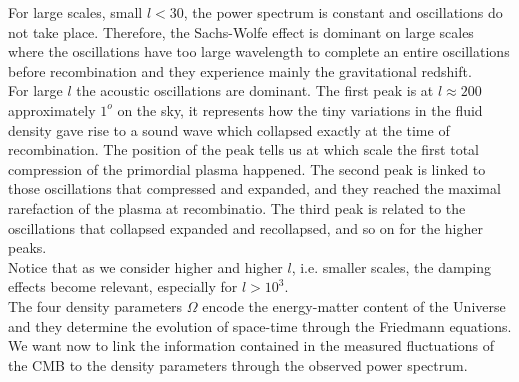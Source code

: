 \documentclass{article}
\begin{document}
%
%
%
For large scales, small $l<30$, the power spectrum is constant and oscillations do not take place.
Therefore, the Sachs-Wolfe effect is dominant on large scales where the oscillations have too large wavelength to complete an entire oscillations before recombination and they experience mainly the gravitational redshift.\\
For large $l$ the acoustic oscillations are dominant.
The first peak is at $l \approx 200$ approximately $1 ^o$ on the sky, it represents how the tiny variations in the fluid density gave rise to a sound wave which collapsed exactly at the time of recombination.
The position of the peak tells us at which scale the first total compression of the primordial plasma happened.
The second peak is linked to those oscillations that compressed and expanded, and they reached the maximal rarefaction of the plasma at recombinatio.
The third peak is related to the oscillations that collapsed expanded and recollapsed, and so on for the higher peaks.\\
Notice that as we consider higher and higher $l$, i.e. smaller scales, the damping effects become relevant, especially for  $l>10^{3}$.\\

The four density parameters $\Omega$ encode the energy-matter content of the Universe and they determine the evolution of space-time through the Friedmann equations. 
We want now to link the information contained in the measured fluctuations of the CMB to the density parameters through the observed power spectrum.\\
\end{document}
